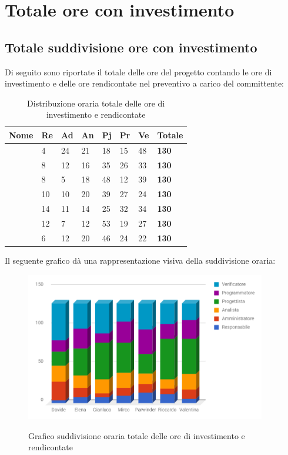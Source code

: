 \documentclass[PianoDiProgetto.tex]{subfiles}
\begin{document}
\section{Totale ore con investimento}
\subsection{Totale suddivisione ore con investimento}
Di seguito sono riportate il totale delle ore del progetto contando le ore di investimento e delle ore rendicontate nel preventivo a carico del committente:
\begin{center}
\begin{table}[htbp]
	\centering
	\renewcommand\arraystretch{1.5}
	\begin{tabularx}{\textwidth}{p{4cm}|p{1cm}|p{1cm}|p{1cm}|p{1cm}|p{1cm}|p{1cm}|p{2cm}}
		\hline
		\textbf{Nome} & \textbf{Re} & \textbf{Ad} & \textbf{An} & \textbf{Pj} & \textbf{Pr} & \textbf{Ve} & \textbf{Totale} \\
		\hline
		\Davide & 4 & 24 & 21 & 18 & 15 & 48 & \textbf{130} \\
		\hline
		\Elena & 8 & 12 & 16 & 35 & 26 & 33 & \textbf{130} \\
		\hline
		\Gianluca & 8 & 5 & 18 & 48 & 12 & 39 & \textbf{130} \\
		\hline
		\Mirco & 10 & 10 & 20 & 39 & 27 & 24 & \textbf{130} \\
		\hline
		\Parwinder & 14 & 11 & 14 & 25 & 32 & 34 & \textbf{130} \\
		\hline
		\Riccardo & 12 & 7 & 12 & 53 & 19 & 27 & \textbf{130} \\
		\hline
		\Valentina & 6 & 12 & 20 & 46 & 24 & 22 & \textbf{130} \\
		\hline
	\end{tabularx}
	\caption{Distribuzione oraria totale delle ore di investimento e rendicontate}
	\label{my-label}
\end{table}
\end{center}
Il seguente grafico dà una rappresentazione visiva della suddivisione oraria:
\begin{figure}[h]
	\centering
	\includegraphics[width=10.5cm]{images/prospettoOrario/totale.png}
	\label{fig:foo}
	\caption{Grafico suddivisione oraria totale delle ore di investimento e rendicontate}
\end{figure} 
\clearpage
\end{document}
